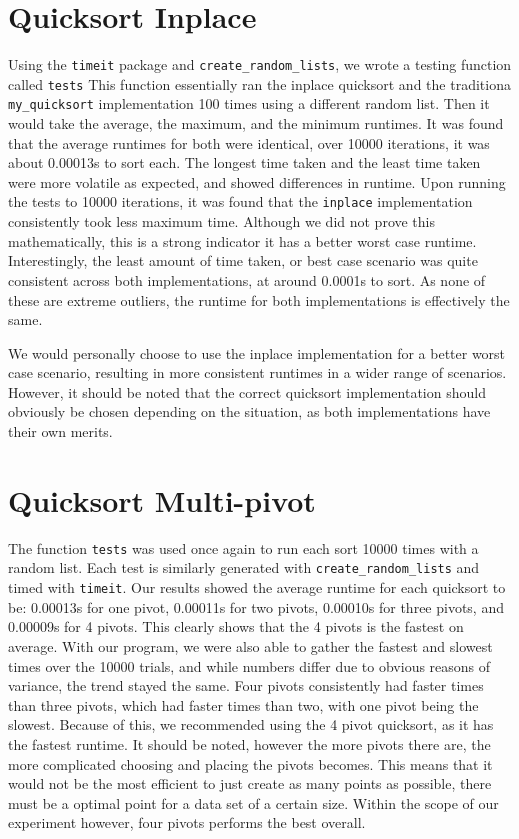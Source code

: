 \documentclass{article}
\begin{document}
\section*{Quicksort Inplace}
Using the \verb|timeit| package and \verb|create_random_lists|, we wrote a testing function called \verb|tests| This function essentially ran the inplace quicksort and the traditiona \verb|my_quicksort| implementation 100 times using a different random list. Then it would take the average, the maximum, and the minimum runtimes. It was found that the average runtimes for both were identical, over 10000 iterations, it was about 0.00013s to sort each.
\break \break
The longest time taken and the least time taken were more volatile as expected, and showed differences in runtime. Upon running the tests to 10000 iterations, it was found that the \verb|inplace| implementation consistently took less maximum time. Although we did not prove this mathematically, this is a strong indicator it has a better worst case runtime. Interestingly, the least amount of time taken, or best case scenario was quite consistent across both implementations, at around 0.0001s to sort. As none of these are extreme outliers, the runtime for both implementations is effectively the same.

We would personally choose to use the inplace implementation for a better worst case scenario, resulting in more consistent runtimes in a wider range of scenarios. However, it should be noted that the correct quicksort implementation should obviously be chosen depending on the situation, as both implementations have their own merits.

\section*{Quicksort Multi-pivot}
The function \verb|tests| was used once again to run each sort 10000 times with a random list. Each test is similarly generated with \verb|create_random_lists| and timed with \verb|timeit|. Our results showed the average runtime for each quicksort  to be: 0.00013s for one pivot, 0.00011s for two pivots, 0.00010s for three pivots, and 0.00009s for 4 pivots. This clearly shows that the 4 pivots is the fastest on average. With our program, we were also able to gather the fastest and slowest times over the 10000 trials, and while numbers differ due to obvious reasons of variance, the trend stayed the same. Four pivots consistently had faster times than three pivots, which had faster times than two, with one pivot being the slowest. Because of this, we recommended using the 4 pivot quicksort, as it has the fastest runtime. It should be noted, however the more pivots there are, the more complicated choosing and placing the pivots becomes. This means that it would not be the most efficient to just create as many points as possible, there must be a optimal point for a data set of a certain size. Within the scope of our experiment however, four pivots performs the best overall.
\end{document}
